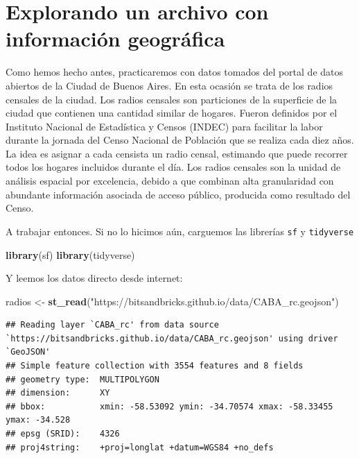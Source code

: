 \documentclass[spanish,]{book}
\newenvironment{Shaded}{\begin{snugshade}}{\end{snugshade}}
\newcommand{\KeywordTok}[1]{\textcolor[rgb]{0.13,0.29,0.53}{\textbf{#1}}}
\newcommand{\NormalTok}[1]{#1}
\newcommand{\StringTok}[1]{\textcolor[rgb]{0.31,0.60,0.02}{#1}}
\begin{document}
\hypertarget{explorando-un-archivo-con-informacion-geografica}{%
\section{Explorando un archivo con información geográfica}\label{explorando-un-archivo-con-informacion-geografica}}

Como hemos hecho antes, practicaremos con datos tomados del portal de datos abiertos de la Ciudad de Buenos Aires. En esta ocasión se trata de los radios censales de la ciudad. Los radios censales son particiones de la superficie de la ciudad que contienen una cantidad similar de hogares. Fueron definidos por el Instituto Nacional de Estadística y Censos (INDEC) para facilitar la labor durante la jornada del Censo Nacional de Población que se realiza cada diez años. La idea es asignar a cada censista un radio censal, estimando que puede recorrer todos los hogares incluidos durante el día. Los radios censales son la unidad de análisis espacial por excelencia, debido a que combinan alta granularidad con abundante información asociada de acceso público, producida como resultado del Censo.

A trabajar entonces. Si no lo hicimos aún, carguemos las librerías \texttt{sf} y \texttt{tidyverse}

\begin{Shaded}
\begin{Highlighting}[]
\KeywordTok{library}\NormalTok{(sf)}
\KeywordTok{library}\NormalTok{(tidyverse)}
\end{Highlighting}
\end{Shaded}

Y leemos los datos directo desde internet:

\begin{Shaded}
\begin{Highlighting}[]
\NormalTok{radios <-}\StringTok{ }\KeywordTok{st_read}\NormalTok{(}\StringTok{"https://bitsandbricks.github.io/data/CABA_rc.geojson"}\NormalTok{)}
\end{Highlighting}
\end{Shaded}

\begin{verbatim}
## Reading layer `CABA_rc' from data source `https://bitsandbricks.github.io/data/CABA_rc.geojson' using driver `GeoJSON'
## Simple feature collection with 3554 features and 8 fields
## geometry type:  MULTIPOLYGON
## dimension:      XY
## bbox:           xmin: -58.53092 ymin: -34.70574 xmax: -58.33455 ymax: -34.528
## epsg (SRID):    4326
## proj4string:    +proj=longlat +datum=WGS84 +no_defs
\end{verbatim}
\end{document}
